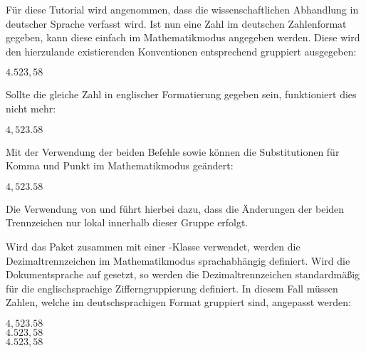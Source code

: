 \documentclass[english,ngerman]{tudscrartcl}
\begin{document}
Für diese Tutorial wird angenommen, dass die wissenschaftlichen Abhandlung in 
deutscher Sprache verfasst wird. Ist nun eine Zahl im deutschen Zahlenformat 
gegeben, kann diese einfach im Mathematikmodus angegeben werden. Diese wird 
den hierzulande existierenden Konventionen entsprechend gruppiert ausgegeben:
%
\begin{Trunk*}
\(4.523,58\)
\end{Trunk*}
%
Sollte die gleiche Zahl in englischer Formatierung gegeben sein, funktioniert 
dies nicht mehr:
%
\begin{Trunk*}
\(4,523.58\)
\end{Trunk*}
%
Mit der Verwendung der beiden Befehle \PParameter{\bsc,}
sowie \PParameter{,} können die Substitutionen für Komma und 
Punkt im Mathematikmodus geändert:
%
\begin{Trunk*}
\begingroup
  \commaswap{\,}
  \dotswap{,}
  \(4,523.58\)
\endgroup
\end{Trunk*}
%
Die Verwendung von  und  führt hierbei 
dazu, dass die Änderungen der beiden Trennzeichen nur lokal innerhalb dieser 
Gruppe erfolgt.

Wird das Paket  zusammen mit einer \TUDScript-Klasse 
verwendet, werden die Dezimaltrennzeichen im Mathematikmodus sprachabhängig 
definiert. Wird die Dokumentsprache auf  gesetzt, so werden die
Dezimaltrennzeichen standardmäßig für die englischsprachige Zifferngruppierung 
definiert. In diesem Fall müssen Zahlen, welche im deutschsprachigen Format 
gruppiert sind, angepasst werden:
%
\begin{Trunk*}
\begingroup%
  \(4,523.58\)\\
  \(4.523,58\)\\
  \dotswap{\,}
  \(4.523,58\)%
\endgroup
\end{Trunk*}
%
\FinishTutorial
\end{document}
